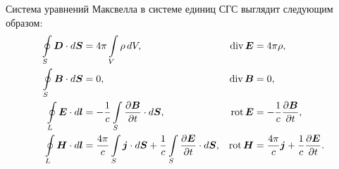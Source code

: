 Система уравнений Максвелла в системе единиц СГС выглядит следующим образом:
\begin{equation}
	\eqmark{maxwell-sgs}
	    \begin{aligned}
        \oint\limits_S\vec{D}\cdot d\vec{S} &= 4\pi \int\limits_V\rho\,dV,
        & \Div\vec{E} &= 4\pi \rho, \\
        \oint\limits_S\vec{B}\cdot d\vec{S} &= 0,
        & \Div\vec{B} &= 0, \\
        \oint\limits_L\vec{E}\cdot d\vec{l} &=
        - \frac{1}{c} \int\limits_S\frac{\partial{\vec{B}}} {\partial t}\cdot d\vec{S},
        & \Rot\vec{E} &= -\frac{1}{c}\frac{\partial\vec B}{\partial t}, \\
        \oint\limits_L\vec{H}\cdot d\vec{l} &=
        \frac{4\pi}{c}\int\limits_S\vec{j}\cdot d\vec{S} +
        \frac{1}{c}\int\limits_S\frac{\partial{\vec{E}}}{\partial t}\cdot d\vec{S},
        & \Rot\vec{H} &= \frac{4\pi}{c}\vec{j} + \frac{1}{c}\frac{\partial\vec E}{\partial t}.
    \end{aligned}
\end{equation}
